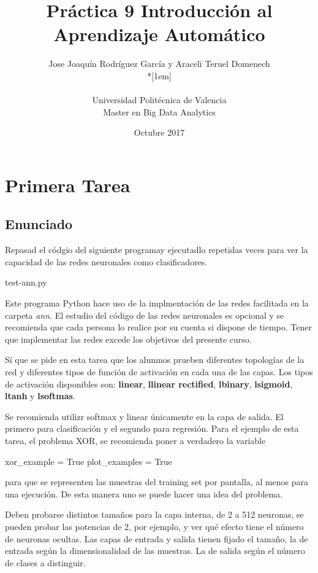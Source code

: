 \documentclass[12pt,twoside]{article}
\title{Práctica 9 Introducción al Aprendizaje Automático}
\author{Jose Joaquín Rodríguez García y Araceli Teruel Domenech\\*[1em]
\begin{minipage}{0.75\textwidth}
\footnotesize \itshape
\begin{center}
Universidad Politécnica de Valencia \\
Master en Big Data Analytics
\end{center}
\end{minipage}
}
\date{Octubre 2017}
\begin{document}
\maketitle


\section{Primera Tarea}

\subsection{Enunciado}

\noindent
Repasad el códgio del siguiente programay ejecutadlo repetidas veces para ver la capacidad de las redes neuronales como clasificadores.
\begin{center}
\textsf{test-ann.py}
\end{center}

Este programa Python hace uso de la implmentación de las redes facilitada en la carpeta \textit{ann}. El estudio del código de las redes neuronales es opcional y se recomienda que cada persona lo realice por su cuenta si dispone de tiempo. Tener que implementar las redes excede los objetivos del presente curso.

Sí que se pide en esta tarea que los alumnos prueben diferentes topologías de la red y diferentes tipos de función de activación en cada una de las capas. Los tipos de activación disponibles son: \textbf{linear}, \textbf{llinear rectified}, \textbf{lbinary}, \textbf{lsigmoid}, \textbf{ltanh} y \textbf{lsoftmas}.

Se recomienda utilizr softmax y linear únicamente en la capa de salida. El primero para clasificación y el segundo para regresión.
Para el ejemplo de esta tarea, el problema XOR, se recomienda poner a verdadero la variable
\begin{center}
\textsf{xor\_example = True}
\textsf{plot\_examples = True}
\end{center}
para que se representen las muestras del training set por pantalla, al menos para una ejecución. De esta manera uno se puede hacer una idea del problema.

Deben probarse distintos tamaños para la capa interna, de 2 a 512 neuronas, se pueden probar las potencias de 2, por ejemplo, y ver qué efecto tiene el número de neuronas ocultas. Las capas de entrada y salida tienen fijado el tamaño, la de entrada según la dimensionalidad de las muestras. La de salida según el número de clases a distinguir.
\end{document}
